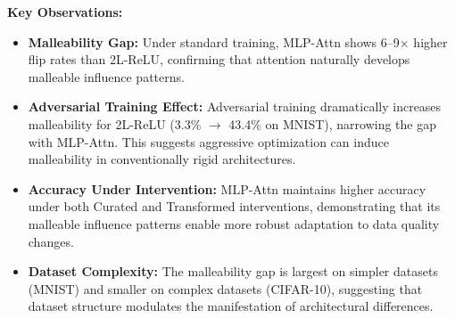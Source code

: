 \documentclass{article}
\theoremstyle{plain}
\theoremstyle{definition}
\theoremstyle{remark}
\begin{document}
\textbf{Key Observations:}
\begin{itemize}
\item \textbf{Malleability Gap:} Under standard training, MLP-Attn shows 6--9$\times$ higher flip rates than 2L-ReLU, confirming that attention naturally develops malleable influence patterns.
\item \textbf{Adversarial Training Effect:} Adversarial training dramatically increases malleability for 2L-ReLU (3.3\% $\to$ 43.4\% on MNIST), narrowing the gap with MLP-Attn. This suggests aggressive optimization can induce malleability in conventionally rigid architectures.
\item \textbf{Accuracy Under Intervention:} MLP-Attn maintains higher accuracy under both Curated and Transformed interventions, demonstrating that its malleable influence patterns enable more robust adaptation to data quality changes.
\item \textbf{Dataset Complexity:} The malleability gap is largest on simpler datasets (MNIST) and smaller on complex datasets (CIFAR-10), suggesting that dataset structure modulates the manifestation of architectural differences.
\end{itemize}
\end{document}
